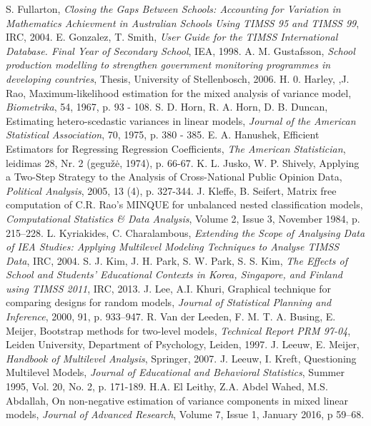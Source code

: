 \documentclass[11pt,a4paper]{article}
\begin{document}
\begin{thebibliography}{1}
 S. Fullarton, \textit{Closing the Gaps Between Schools: Accounting for Variation in Mathematics Achievment in Australian Schools Using TIMSS 95 and TIMSS 99}, IRC, 2004.
 E. Gonzalez, T. Smith, \textit{User Guide for the TIMSS International Database. Final Year of Secondary School}, IEA, 1998.
 A. M. Gustafsson, \textit{School production modelling to strengthen government monitoring programmes in developing countries}, Thesis, University of Stellenbosch, 2006.
 H. 0. Harley, ,J. Rao, Maximum-likelihood estimation for the mixed analysis of variance model, \textit{Biometrika}, 54, 1967, p. 93 - 108.
 S. D. Horn, R. A. Horn, D. B. Duncan, Estimating hetero-scedastic variances in linear models, \textit{Journal of the American Statistical Association}, 70, 1975, p. 380 - 385.
 E. A. Hanushek,  Efficient Estimators for Regressing Regression Coefficients, \textit{The American Statistician}, leidimas 28, Nr. 2 (gegužė, 1974), p. 66-67.
 K. L. Jusko, W. P. Shively, Applying a Two-Step Strategy to the Analysis of Cross-National Public Opinion Data, \textit{Political Analysis}, 2005, 13 (4), p. 327-344. 
 J. Kleffe, B. Seifert, Matrix free computation of C.R. Rao's MINQUE for unbalanced nested classification models, \textit{Computational Statistics \& Data Analysis}, Volume 2, Issue 3, November 1984, p. 215–228.
 L. Kyriakides, C. Charalambous, \textit{ Extending the Scope of Analysing Data of IEA Studies: Applying Multilevel Modeling Techniques to Analyse TIMSS Data}, IRC, 2004.
 S. J. Kim, J. H. Park, S. W. Park, S. S. Kim, \textit{The Effects of School and Students’ Educational Contexts in Korea, Singapore, and Finland using TIMSS 2011}, IRC, 2013.
J. Lee, A.I. Khuri, Graphical technique for comparing designs for random models, \textit{Journal of Statistical Planning and Inference}, 2000, 91, p. 933–947.
 R. Van der Leeden, F. M. T. A. Busing, E. Meijer, Bootstrap methods for two-level models, \textit{Technical Report PRM 97-04}, Leiden University, Department of Psychology, Leiden, 1997.
J. Leeuw, E. Meijer, \textit{Handbook of Multilevel Analysis}, Springer, 2007.
 J. Leeuw, I. Kreft, Questioning Multilevel Models, \textit{Journal of Educational and Behavioral Statistics}, Summer 1995, Vol. 20, No. 2, p. 171-189.
  H.A. El  Leithy, Z.A. Abdel  Wahed,  M.S.  Abdallah,  On  non-negative  estimation  of
variance components in mixed linear models, \textit{Journal of Advanced Research}, Volume 7, Issue 1, January 2016, p 59–68.

\end{thebibliography}
\end{document}
